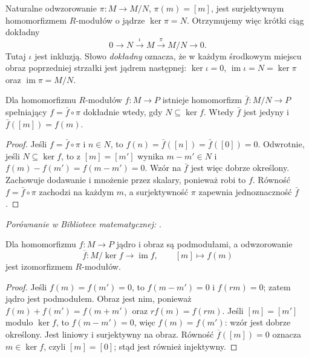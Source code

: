 Naturalne odwzorowanie $\pi\colon M\to M/N$, $\pi(m)=[m]$,
jest surjektywnym homomorfizmem $R$-modułów o jądrze
$\ker\pi=N$.
Otrzymujemy więc krótki ciąg dokładny
\[
0\longrightarrow N
\overset{\iota}{\longrightarrow} M
\overset{\pi}{\longrightarrow}M/N
\longrightarrow0.
\]
Tutaj $\iota$ jest inkluzją. Słowo \emph{dokładny} oznacza,
że w każdym środkowym miejscu obraz poprzedniej strzałki
jest jądrem następnej: $\ker\iota=0$,
$\operatorname{im}\iota=N=\ker\pi$ oraz
$\operatorname{im}\pi=M/N$.

\begin{stwierdzenie}
\label{prop:module-quotient-universal-5}
Dla homomorfizmu $R$-modułów $f:M\to P$ istnieje
homomorfizm $\bar f:M/N\to P$ spełniający
$f=\bar f\circ\pi$ dokładnie wtedy, gdy
$N\subseteq\ker f$. Wtedy $\bar f$ jest jedyny
i $\bar f([m])=f(m)$.
\end{stwierdzenie}
\begin{proof}
Jeśli $f=\bar f\circ\pi$ i $n\in N$, to
$f(n)=\bar f([n])=\bar f([0])=0$.
Odwrotnie, jeśli $N\subseteq\ker f$, to z
$[m]=[m']$ wynika $m-m'\in N$ i
$f(m)-f(m')=f(m-m')=0$. Wzór na $\bar f$
jest więc dobrze określony. Zachowuje dodawanie
i mnożenie przez skalary, ponieważ robi to $f$.
Równość $f=\bar f\circ\pi$ zachodzi na każdym $m$,
a surjektywność $\pi$ zapewnia jednoznaczność $\bar f$.
\end{proof}

\noindent\emph{Porównanie w Bibliotece matematycznej:} .

\begin{twierdzenie}
\label{thm:modul-izomorfizm}
Dla homomorfizmu $f:M\to P$ jądro i obraz są podmodułami,
a odwzorowanie
\[
\overline f:M/\ker f\longrightarrow\operatorname{im}f,
\qquad [m]\longmapsto f(m)
\]
jest izomorfizmem $R$-modułów.
\end{twierdzenie}
\begin{proof}
Jeśli $f(m)=f(m')=0$, to $f(m-m')=0$ i $f(rm)=0$;
zatem jądro jest podmodułem. Obraz jest nim, ponieważ
$f(m)+f(m')=f(m+m')$ oraz $rf(m)=f(rm)$.
Jeśli $[m]=[m']$ modulo $\ker f$, to $f(m-m')=0$,
więc $f(m)=f(m')$: wzór jest dobrze określony.
Jest liniowy i surjektywny na obraz. Równość
$\overline f([m])=0$ oznacza $m\in\ker f$, czyli $[m]=[0]$;
stąd jest również injektywny.
\end{proof}

